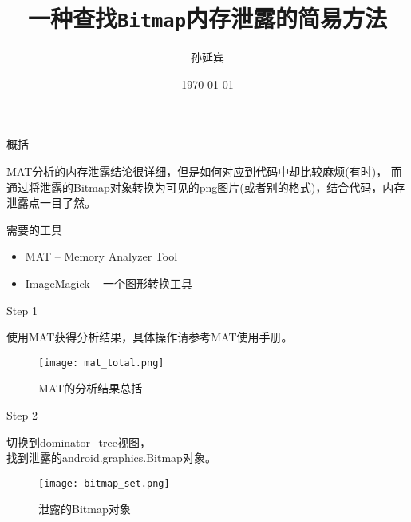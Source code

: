 ﻿\documentclass{beamer}
\title{一种查找\texttt{Bitmap}内存泄露的简易方法}
\author{孙延宾}
\institute{西安$\cdot$业务软件开发一部$\cdot$~\texttt{ZTE}}
\date{\today}
\begin{document}
  \begin{frame}[plain]
    \titlepage
  \end{frame}

  \tt

  \begin{frame}{概括}
  \begin{framedtext}
    MAT分析的内存泄露结论很详细，但是如何对应到代码中却比较麻烦(有时)，
    而通过将泄露的Bitmap对象转换为可见的png图片(或者别的格式)，结合代码，内存泄露点一目了然。
  \end{framedtext}
  \end{frame}

  \begin{frame}{需要的工具}
  \begin{framedtext}
    \begin{itemize}
      \item MAT -- Memory Analyzer Tool
      \item ImageMagick -- 一个图形转换工具
    \end{itemize}
  \end{framedtext}
  \end{frame}

  \begin{frame}{Step 1}
  \begin{framedtext}
    使用MAT获得分析结果，具体操作请参考MAT使用手册。
  \end{framedtext}
  \end{frame}

  \begin{frame}
    \begin{figure}
      \centering
      \texttt{[image: mat\_total.png]}\\
      \caption{MAT的分析结果总括}\label{git:matresult}
    \end{figure}
  \end{frame}

  \begin{frame}{Step 2}
  \begin{framedtext}
    切换到dominator\_tree视图，\\
    找到泄露的android.graphics.Bitmap对象。
  \end{framedtext}
  \end{frame}

  \begin{frame}
    \begin{figure}
      \centering
      \texttt{[image: bitmap\_set.png]}\\
      \caption{泄露的Bitmap对象}\label{fig:bitmap}
    \end{figure}
  \end{frame}
\end{document}
